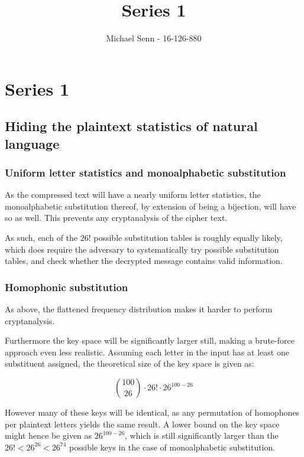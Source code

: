 \documentclass[a4paper]{scrreprt}
\title{Series 1}
\author{Michael Senn \maillink{michael.senn@students.unibe.ch} - 16-126-880}
\date{\printdate}
\begin{document}
\maketitle


\setcounter{chapter}{0}
\chapter{Series 1}

\section{Hiding the plaintext statistics of natural language}

\subsection{Uniform letter statistics and monoalphabetic substitution}

As the compressed text will have a nearly uniform letter statistics, the
monoalphabetic substitution thereof, by extension of being a bijection, will
have so as well. This prevents any cryptanalysis of the cipher text.

As such, each of the $26!$ possible substitution tables is roughly equally
likely, which does require the adversary to systematically try possible
substitution tables, and check whether the decrypted message contains valid
information.

\subsection{Homophonic substitution}

As above, the flattened frequency distribution makes it harder to perform
cryptanalysis.

Furthermore the key space will be significantly larger still, making a
brute-force approach even less realistic. Assuming each letter in the input has
at least one substituent assigned, the theoretical size of the key space is
given as:

\[
	\binom{100}{26} \cdot 26! \cdot 26^{100 - 26}
\]

However many of these keys will be identical, as any permutation of homophones
per plaintext letters yields the same result. A lower bound on the key space
might hence be given as $26^{100 - 26}$, which is still significantly larger
than the $26! < 26^{26} < 26^{74}$ possible keys in the case of monoalphabetic
substitution.
\end{document}
